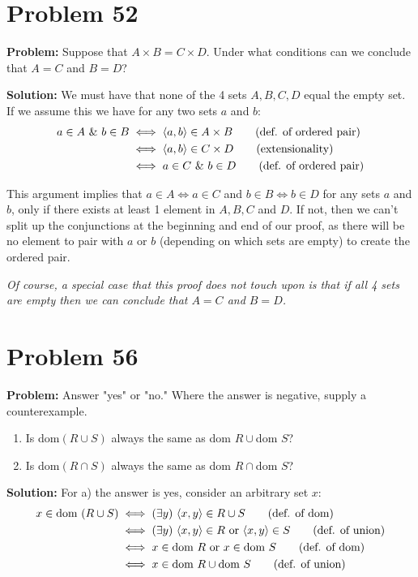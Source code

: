 \documentclass{article}
\begin{document}
\section*{Problem 52}
\noindent\textbf{Problem:} Suppose that $A\times B = C\times D$. Under what conditions can we conclude that $A = C$ and $B = D$?
\bigskip

\noindent\textbf{Solution:} We must have that none of the 4 sets $A,B,C,D$ equal the empty set. If we assume this we have for any two sets $a$ and $b$:
\begin{align*}
    a\in A\,\,\&\,\, b\in B&\iff\langle a,b\rangle\in A\times B\tag{def. of ordered pair}\\
    &\iff\langle a,b\rangle\in C\times D\tag{extensionality}\\
    &\iff a\in C\,\,\&\,\, b\in D\tag{def. of ordered pair}
\end{align*}

This argument implies that $a\in A\iff a\in C$ and $b\in B\iff b\in D$ for any sets $a$ and $b$, only if there exists at least 1 element in $A, B, C$ and $D$. If not, then we can't split up the conjunctions at the beginning and end of our proof, as there will be no element to pair with $a$ or $b$ (depending on which sets are empty) to create the ordered pair.

\textit{Of course, a special case that this proof does not touch upon is that if all 4 sets are empty then we can conclude that $A = C$ and $B = D$.}
\bigskip

\section*{Problem 56}
\noindent\textbf{Problem:} Answer "yes" or "no." Where the answer is negative, supply a counterexample.

\begin{enumerate}[label=\alph*)]
    \item Is dom$(R\cup S)$ always the same as dom $R\cup\phantom{}$dom $S$?
    \item Is dom$(R\cap S)$ always the same as dom $R\cap\phantom{}$dom $S$?
\end{enumerate}
\medskip

\noindent\textbf{Solution:} For a) the answer is yes, consider an arbitrary set $x$:
\begin{align*}
    x\in\text{dom }(R\cup S)&\iff(\exists y)\,\,\langle x,y\rangle\in R\cup S\tag{def. of dom}\\
    &\iff(\exists y)\,\,\langle x,y\rangle\in R\text{ or }\langle x,y\rangle\in S\tag{def. of union}\\
    &\iff x\in\text{dom }R\text{ or } x\in\text{dom }S\tag{def. of dom}\\
    &\iff x\in\text{dom }R\cup\text{dom }S\tag{def. of union}
\end{align*}
\end{document}
